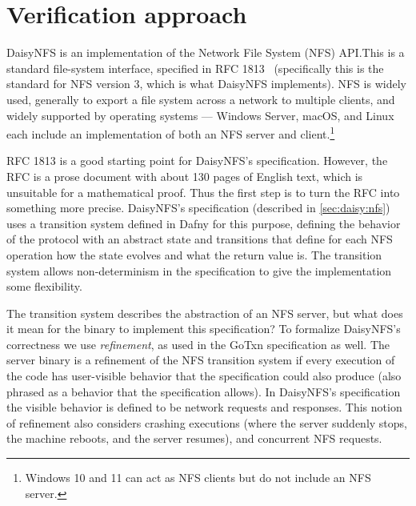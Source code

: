 \section{Verification approach}%
\label{sec:daisy:motivation}

DaisyNFS is an implementation of the Network File System (NFS) API.\@ This is a
standard file-system interface, specified in RFC 1813~\cite{RFC:1813}
(specifically this is the standard for NFS version 3, which is what DaisyNFS
implements). NFS is widely used, generally to export a file system across a
network to multiple clients, and widely supported by operating systems ---
Windows Server, macOS, and Linux each include an implementation of both an NFS
server and client.\footnote{Windows 10 and 11 can act as NFS clients but do not
include an NFS server.}

RFC 1813 is a good starting point for DaisyNFS's specification.
However, the RFC is a prose document with about 130 pages of English text,
which is unsuitable for a mathematical proof. Thus the first step is
to turn the RFC into something more precise. DaisyNFS's specification (described in
\cref{sec:daisy:nfs}) uses a
transition system defined in Dafny for this purpose, defining the behavior of
the protocol with an abstract state and transitions that define
for each NFS operation how the state evolves and what the return value is. The
transition system allows non-determinism in the specification to give the
implementation some flexibility.

The transition system describes the abstraction of an NFS server, but what does
it mean for the  binary to implement this specification? To formalize
DaisyNFS's correctness we use \emph{refinement}, as used in the GoTxn
specification as well. The server binary is a refinement of the NFS transition
system if every execution of the code has
user-visible behavior that the specification could also produce (also phrased as
a behavior that the specification allows). In DaisyNFS's specification the visible
behavior is defined to be network requests and responses. This
notion of refinement also considers crashing executions (where the server
suddenly stops, the machine reboots, and the server resumes), and concurrent NFS
requests.

